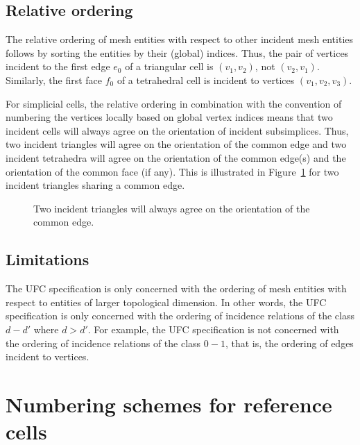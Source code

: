 \subsection{Relative ordering}

The relative ordering of mesh entities with respect to other incident
mesh entities follows by sorting the entities by their (global)
indices. Thus, the pair of vertices incident to the first edge $e_0$
of a triangular cell is $(v_1, v_2)$, not $(v_2, v_1)$. Similarly, the
first face $f_0$ of a tetrahedral cell is incident to vertices $(v_1,
v_2, v_3)$.

For simplicial cells, the relative ordering in combination with the
convention of numbering the vertices locally based on global vertex
indices means that two incident cells will always agree on the
orientation of incident subsimplices. Thus, two incident triangles
will agree on the orientation of the common edge and two incident
tetrahedra will agree on the orientation of the common edge(s) and the
orientation of the common face (if any). This is illustrated in
Figure~\ref{fig:orientation_example_triangles} for two incident
triangles sharing a common edge.

\begin{figure}[htbp]
  \begin{center}
    \caption{Two incident triangles will always agree on the
      orientation of the common edge.}
    \label{fig:orientation_example_triangles}
  \end{center}
\end{figure}

\subsection{Limitations}
 
The UFC specification is only concerned with the ordering of mesh
entities with respect to entities of larger topological dimension. In
other words, the UFC specification is only concerned with the ordering
of incidence relations of the class $d - d'$ where $d > d'$. For
example, the UFC specification is not concerned with the ordering of
incidence relations of the class $0 - 1$, that is, the ordering of
edges incident to vertices.

\newpage

\section{Numbering schemes for reference cells}

